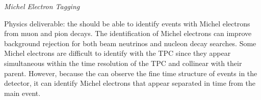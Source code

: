

\textit{\it Michel Electron Tagging}

Physics deliverable: the  should be able to identify events with Michel electrons from muon and pion decays.
The identification of Michel electrons can improve background rejection for both beam neutrinos and nucleon decay searches. 
Some Michel electrons are difficult to identify with the TPC since they appear simultaneous within the time resolution of the TPC and collinear with their parent. However, because the  can observe the fine time structure of events in the detector, it can identify Michel electrons that appear separated in time from the main event.



